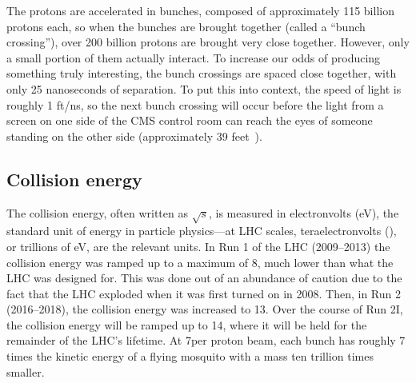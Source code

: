 The protons are accelerated in bunches, composed of approximately 115 billion protons each, so when the bunches are brought together (called a ``bunch crossing''), over 200 billion protons are brought very close together.
However, only a small portion of them actually interact. 
To increase our odds of producing something truly interesting, the bunch crossings are spaced close together, with only 25 nanoseconds of separation. 
To put this into context, the speed of light is roughly 1 ft/ns, so the next bunch crossing will occur before the light from a screen on one side of the CMS control room can reach the eyes of someone standing on the other side (approximately 39 feet~\cite{CMSP5Layout}).

\subsection{Collision energy}
The collision energy, often written as $\sqrt{s}$, is measured in electronvolts (eV), the standard unit of energy in particle physics---at LHC scales, teraelectronvolts (\TeVns), or trillions of eV, are the relevant units. 
In Run 1 of the LHC (2009--2013) the collision energy was ramped up to a maximum of 8\TeV, much lower than what the LHC was designed for. %
This was done out of an abundance of caution due to the fact that the LHC exploded\footnotemark{} when it was first turned on in 2008. 
Then, in Run 2 (2016--2018), the collision energy was increased to 13\TeV. 
Over the course of Run 2I, the collision energy will be ramped up to 14\TeV, where it will be held for the remainder of the LHC's lifetime. 
At 7\TeV per proton beam, each bunch has roughly 7 times the kinetic energy of a flying mosquito with a mass ten trillion times smaller. 

